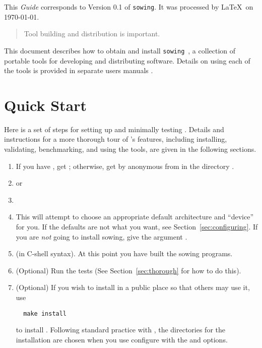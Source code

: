 \documentclass[11pt,twoside]{article}
\begin{document}

\clearpage
{}
\setcounter{page}{3}
\pagestyle{plain}
{\parskip=0pt
\tableofcontents
\bigskip
\bigskip
This {\em Guide\/} corresponds to Version 0.1 of {\tt sowing}.  It was
processed by \LaTeX\ on \today.
\clearpage
}
\setcounter{page}{1}

\begin{abstract}
 Tool building and distribution is important.
\end{abstract}

This document describes how to obtain and install
\texttt{sowing}~\cite{Gropp:1997:SMC}, a collection of portable tools for
developing and 
distributing software.  Details on using each of the tools is provided in
separate users manuals \cite{bfort,doctext,tohtml}.

\section{Quick Start}
\label{sec:quickstart}

Here is a set of steps for setting up and minimally testing .
Details and instructions for a more thorough tour of 's features,
including installing, validating, benchmarking, and using the tools, are given
in the following sections.  
\begin{enumerate}
\item If you have , get ; otherwise, get 
 by anonymous  from
   in the directory .
\item {} or 
\item {}
\item {}  This will attempt to choose an appropriate default
  architecture and ``device'' for you.  If the defaults are not what you want,
  see Section~\ref{sec:configuring}.  If you are \emph{not} going to install
  sowing, give  the argument .
\item {} (in C-shell syntax).  
At this point you have built the sowing programs.  
\item (Optional)  Run the tests
  (See Section~\ref{sec:thorough} for how to do this).  
\item (Optional)  If you wish to install  in a public place so
  that others may use it, use
\begin{verbatim}
  make install
\end{verbatim}
to install .  Following standard practice with ,
the directories for the installation are chosen when you use configure with
the  and  options.
\end{enumerate}
\end{document}
